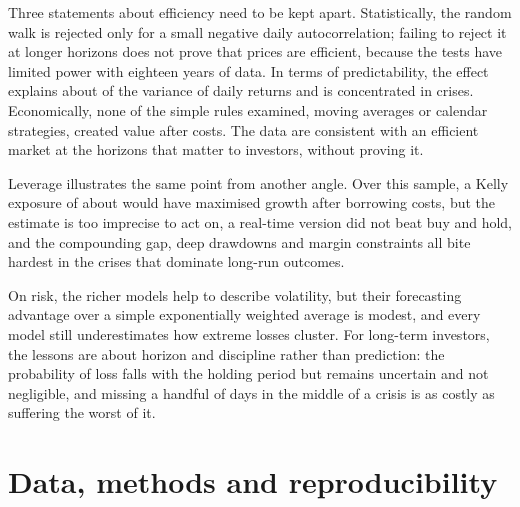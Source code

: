 \documentclass[11pt,a4paper]{article}
\newcommand{\note}[1]{{\footnotesize\color{muted}#1\par}}
\begin{document}
Three statements about efficiency need to be kept apart. Statistically, the random walk is rejected only for a small negative daily autocorrelation; failing to reject it at longer horizons does not prove that prices are efficient, because the tests have limited power with eighteen years of data. In terms of predictability, the effect explains about  of the variance of daily returns and is concentrated in crises. Economically, none of the simple rules examined, moving averages or calendar strategies, created value after costs. The data are consistent with an efficient market at the horizons that matter to investors, without proving it.

Leverage illustrates the same point from another angle. Over this sample, a Kelly exposure of about  would have maximised growth after borrowing costs, but the estimate is too imprecise to act on, a real-time version did not beat buy and hold, and the compounding gap, deep drawdowns and margin constraints all bite hardest in the crises that dominate long-run outcomes.

On risk, the richer models help to describe volatility, but their forecasting advantage over a simple exponentially weighted average is modest, and every model still underestimates how extreme losses cluster. For long-term investors, the lessons are about horizon and discipline rather than prediction: the probability of loss falls with the holding period but remains uncertain and not negligible, and missing a handful of days in the middle of a crisis is as costly as suffering the worst of it.

\section*{Data, methods and reproducibility}
\note{}
\end{document}
